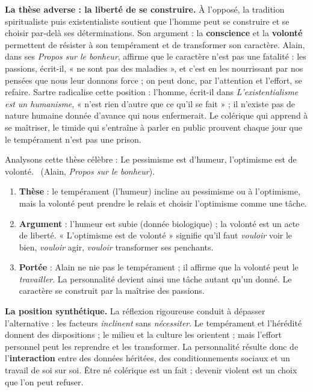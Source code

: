 \documentclass[11pt]{article}
\begin{document}
\textbf{La thèse adverse : la liberté de se construire.} À l'opposé, la tradition spiritualiste puis existentialiste soutient que l'homme peut se construire et se choisir par-delà ses déterminations. Son argument : la \textbf{conscience} et la \textbf{volonté} permettent de résister à son tempérament et de transformer son caractère. Alain, dans ses \emph{Propos sur le bonheur}, affirme que le caractère n'est pas une fatalité : les passions, écrit-il, « ne sont pas des maladies », et c'est en les nourrissant par nos pensées que nous leur donnons force ; on peut donc, par l'attention et l'effort, se refaire. Sartre radicalise cette position : l'homme, écrit-il dans \emph{L'existentialisme est un humanisme}, « n'est rien d'autre que ce qu'il se fait » ; il n'existe pas de nature humaine donnée d'avance qui nous enfermerait. Le colérique qui apprend à se maîtriser, le timide qui s'entraîne à parler en public prouvent chaque jour que le tempérament n'est pas une prison.

\begin{experience}
Analysons cette thèse célèbre : \guillemotleft Le pessimisme est d'humeur, l'optimisme est de volonté. \guillemotright\ (Alain, \emph{Propos sur le bonheur}).
\begin{enumerate}
\item \textbf{Thèse} : le tempérament (l'humeur) incline au pessimisme ou à l'optimisme, mais la volonté peut prendre le relais et choisir l'optimisme comme une tâche.
\item \textbf{Argument} : l'humeur est subie (donnée biologique) ; la volonté est un acte de liberté. « L'optimisme est de volonté » signifie qu'il faut \emph{vouloir} voir le bien, \emph{vouloir} agir, \emph{vouloir} transformer ses penchants.
\item \textbf{Portée} : Alain ne nie pas le tempérament ; il affirme que la volonté peut le \emph{travailler}. La personnalité devient ainsi une tâche autant qu'un donné. Le caractère se construit par la maîtrise des passions.
\end{enumerate}
\end{experience}

\textbf{La position synthétique.} La réflexion rigoureuse conduit à dépasser l'alternative : les facteurs \emph{inclinent} sans \emph{nécessiter}. Le tempérament et l'hérédité donnent des dispositions ; le milieu et la culture les orientent ; mais l'effort personnel peut les reprendre et les transformer. La personnalité résulte donc de l'\textbf{interaction} entre des données héritées, des conditionnements sociaux et un travail de soi sur soi. Être né colérique est un fait ; devenir violent est un choix que l'on peut refuser.
\end{document}

